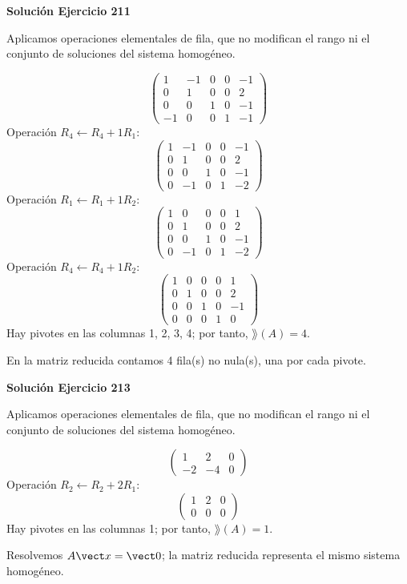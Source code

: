 \par\bigskip\noindent\textbf{Solución Ejercicio 211}\par\nobreak
Aplicamos operaciones elementales de fila, que no modifican el rango ni el conjunto de soluciones del sistema homogéneo.

\[
\begin{pmatrix}1&-1&0&0&-1\\0&1&0&0&2\\0&0&1&0&-1\\-1&0&0&1&-1\end{pmatrix}
\]
Operación $R_{4}\leftarrow R_{4}+1R_{1}$:
\[
\begin{pmatrix}1&-1&0&0&-1\\0&1&0&0&2\\0&0&1&0&-1\\0&-1&0&1&-2\end{pmatrix}
\]
Operación $R_{1}\leftarrow R_{1}+1R_{2}$:
\[
\begin{pmatrix}1&0&0&0&1\\0&1&0&0&2\\0&0&1&0&-1\\0&-1&0&1&-2\end{pmatrix}
\]
Operación $R_{4}\leftarrow R_{4}+1R_{2}$:
\[
\begin{pmatrix}1&0&0&0&1\\0&1&0&0&2\\0&0&1&0&-1\\0&0&0&1&0\end{pmatrix}
\]
Hay pivotes en las columnas 1, 2, 3, 4; por tanto, $\boxed{\rang(A)=4}$.

En la matriz reducida contamos 4 fila(s) no nula(s), una por cada pivote.


\par\bigskip\noindent\textbf{Solución Ejercicio 213}\par\nobreak
Aplicamos operaciones elementales de fila, que no modifican el rango ni el conjunto de soluciones del sistema homogéneo.

\[
\begin{pmatrix}1&2&0\\-2&-4&0\end{pmatrix}
\]
Operación $R_{2}\leftarrow R_{2}+2R_{1}$:
\[
\begin{pmatrix}1&2&0\\0&0&0\end{pmatrix}
\]
Hay pivotes en las columnas 1; por tanto, $\boxed{\rang(A)=1}$.

Resolvemos $A\vect x=\vect0$; la matriz reducida representa el mismo sistema homogéneo.

